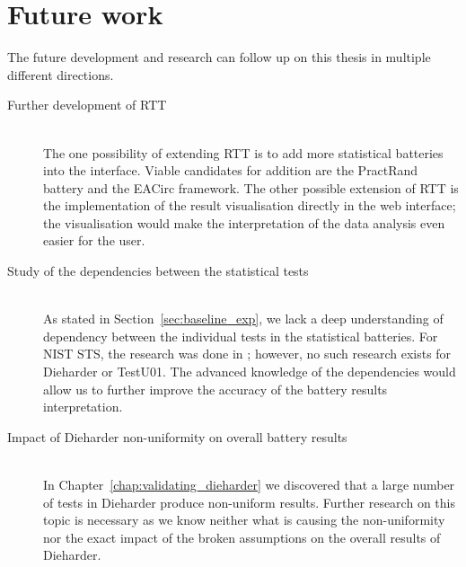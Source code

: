\documentclass[
	digital,    %
	oneside,    %
	color,
	11pt,
	nocover,
	notable,
	nolof,
	nolot,
]{fithesis3}
\theoremstyle{definition}
\theoremstyle{remark}
\begin{document}
\section{Future work}
The future development and research can follow up on this thesis in multiple different directions.

\begin{description}
\item[Further development of RTT] \hfill \\
The one possibility of extending RTT is to add more statistical batteries into the interface. Viable candidates for addition are the PractRand battery \cite{practrand} and the EACirc framework. The other possible extension of RTT is the implementation of the result visualisation directly in the web interface; the visualisation would make the interpretation of the data analysis even easier for the user.

\item[Study of the dependencies between the statistical tests] \hfill \\
As stated in Section~\ref{sec:baseline_exp}, we lack a deep understanding of dependency between the individual tests in the statistical batteries. For NIST STS, the research was done in \cite{nist-sts-interpretation-syso}; however, no such research exists for Dieharder or TestU01. The advanced knowledge of the dependencies would allow us to further improve the accuracy of the battery results interpretation.

\item[Impact of Dieharder non-uniformity on overall battery results] \hfill \\
In Chapter~\ref{chap:validating_dieharder} we discovered that a large number of tests in Dieharder produce non-uniform results. Further research on this topic is necessary as we know neither what is causing the non-uniformity nor the exact impact of the broken assumptions on the overall results of Dieharder.

\end{description}

\appendix

\printbibliography
\end{document}
